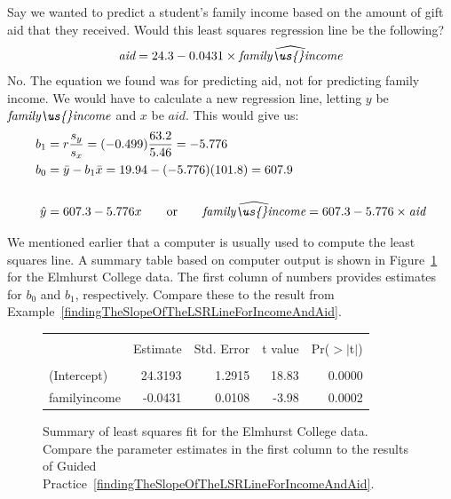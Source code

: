 \begin{examplewrap}
\begin{nexample}{Say we wanted to predict a student's family income based on the amount of gift aid that they received.  Would this least squares regression line be the following?
\begin{align*}
\textit{aid} = 24.3 - 0.0431\times \widehat{\textit{family\us{}income}}
\end{align*}}
No.  The equation we found was for predicting aid, not for predicting family income.  We would have to calculate a new regression line, letting $y$ be $\textit{family\us{}income}$ and $x$ be $\textit{aid}$.  This would give us:
\begin{align*}
b_1 &= r\frac{s_y}{s_x} = (-0.499)\frac{63.2}{5.46} = -5.776 \\
b_0 & = \bar{y} - b_1\bar{x} = 19.94 - (-5.776)(101.8) = 607.9\\
\\
\hat{y}&=607.3 - 5.776x
	\qquad\text{or}\qquad
	\widehat{\textit{family\us{}income}} = 607.3 - 5.776\times \textit{aid}
\end{align*}

\end{nexample}
\end{examplewrap} 


We mentioned earlier that a computer is usually used to compute the least squares line. A summary table based on computer output is shown in Figure~\ref{rOutputForIncomeAidLSRLine} for the Elmhurst College data. The first column of numbers provides estimates for ${b}_0$ and ${b}_1$, respectively. Compare these to the result from Example~\ref{findingTheSlopeOfTheLSRLineForIncomeAndAid}.

\begin{figure}[ht]
\centering
\begin{tabular}{l rrrr}
  \hline
  \vspace{-3.7mm} & & & & \\
 & Estimate & Std. Error & t value & Pr($>$$|$t$|$) \\ 
  \hline
  \vspace{-3.6mm} & & & & \\
(Intercept) & 24.3193 & 1.2915 & 18.83 & 0.0000 \\ 
family\us{}income & -0.0431 & 0.0108 & -3.98 & 0.0002 \\ 
  \hline
\end{tabular}
\caption{Summary of least squares fit for the Elmhurst College data. Compare the parameter estimates in the first column to the results of Guided Practice~\ref{findingTheSlopeOfTheLSRLineForIncomeAndAid}.}
\label{rOutputForIncomeAidLSRLine}
\end{figure}

